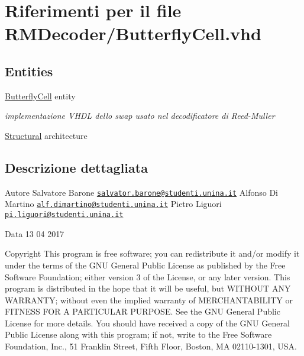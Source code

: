 \hypertarget{_butterfly_cell_8vhd}{\section{Riferimenti per il file R\+M\+Decoder/\+Butterfly\+Cell.vhd}
\label{_butterfly_cell_8vhd}
}
\subsection*{Entities}
\begin{DoxyCompactItemize}
\item 
\hyperlink{class_butterfly_cell}{Butterfly\+Cell} entity
\begin{DoxyCompactList}\small\item\em implementazione V\+H\+D\+L dello swap usato nel decodificatore di Reed-\/\+Muller \end{DoxyCompactList}\item 
\hyperlink{class_butterfly_cell_1_1_structural}{Structural} architecture
\end{DoxyCompactItemize}


\subsection{Descrizione dettagliata}
\begin{DoxyAuthor}{Autore}
Salvatore Barone \href{mailto:salvator.barone@studenti.unina.it}{\tt salvator.\+barone@studenti.\+unina.\+it} Alfonso Di Martino \href{mailto:alf.dimartino@studenti.unina.it}{\tt alf.\+dimartino@studenti.\+unina.\+it} Pietro Liguori \href{mailto:pi.liguori@studenti.unina.it}{\tt pi.\+liguori@studenti.\+unina.\+it} 
\end{DoxyAuthor}
\begin{DoxyDate}{Data}
13 04 2017
\end{DoxyDate}
\begin{DoxyCopyright}{Copyright}
This program is free software; you can redistribute it and/or modify it under the terms of the G\+N\+U General Public License as published by the Free Software Foundation; either version 3 of the License, or any later version. This program is distributed in the hope that it will be useful, but W\+I\+T\+H\+O\+U\+T A\+N\+Y W\+A\+R\+R\+A\+N\+T\+Y; without even the implied warranty of M\+E\+R\+C\+H\+A\+N\+T\+A\+B\+I\+L\+I\+T\+Y or F\+I\+T\+N\+E\+S\+S F\+O\+R A P\+A\+R\+T\+I\+C\+U\+L\+A\+R P\+U\+R\+P\+O\+S\+E. See the G\+N\+U General Public License for more details. You should have received a copy of the G\+N\+U General Public License along with this program; if not, write to the Free Software Foundation, Inc., 51 Franklin Street, Fifth Floor, Boston, M\+A 02110-\/1301, U\+S\+A. 
\end{DoxyCopyright}
